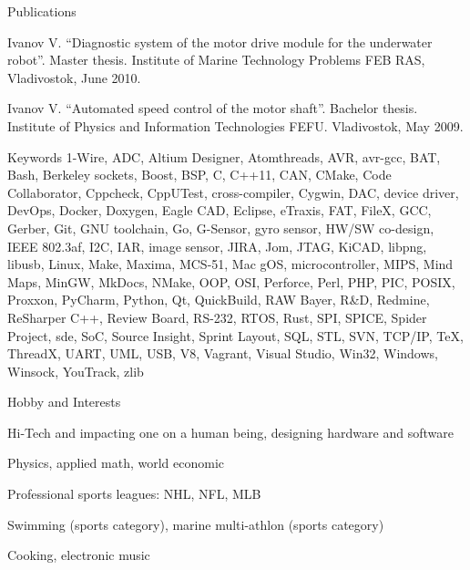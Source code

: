 \documentclass{template}
\begin{document}

\begin{rSection}{Publications}
\begin{rItemize}
\item Ivanov V. \textquotedblleft Diagnostic system of the motor drive module for the underwater robot\textquotedblright. Master thesis. Institute of Marine Technology Problems FEB RAS, Vladivostok, June 2010.
\item Ivanov V. \textquotedblleft Automated speed control of the motor shaft\textquotedblright. Bachelor thesis. \newline Institute of Physics and Information Technologies FEFU. Vladivostok, May 2009.
\end{rItemize}
\end{rSection}


\begin{rSection}{Keywords}
1-Wire, ADC, Altium Designer, Atomthreads, AVR, avr-gcc, BAT, Bash, Berkeley sockets, Boost, BSP, C, C++11, CAN, CMake, Code Collaborator, Cppcheck, CppUTest, cross-compiler, Cygwin, DAC, device driver, DevOps, Docker, Doxygen, Eagle CAD, Eclipse, eTraxis, FAT, FileX, GCC, Gerber, Git, GNU toolchain, Go, G-Sensor, gyro sensor, HW/SW co-design, IEEE 802.3af, I2C, IAR, image sensor, JIRA, Jom, JTAG, KiCAD, libpng, libusb, Linux, Make, Maxima, MCS-51, Mac gOS, microcontroller, MIPS, Mind Maps, MinGW, MkDocs, NMake, OOP, OSI, Perforce, Perl, PHP, PIC, POSIX, Proxxon, PyCharm, Python, Qt, QuickBuild, RAW Bayer, R\&D, Redmine, ReSharper C++, Review Board, RS-232, RTOS, Rust, SPI, SPICE, Spider Project, sde, SoC, Source Insight, Sprint Layout, SQL, STL, SVN, TCP/IP, \TeX, ThreadX, UART, UML, USB, V8, Vagrant, Visual Studio, Win32, Windows, Winsock, YouTrack, zlib
\end{rSection}


\begin{rSection}{Hobby and Interests}
\begin{rHobby}
\item Hi-Tech and impacting one on a human being, designing hardware and software
\item Physics, applied math, world economic
\item Professional sports leagues: NHL, NFL, MLB
\item Swimming (sports category), marine multi-athlon (sports category)
\item Cooking, electronic music
\end{rHobby}
\end{rSection}
\end{document}
